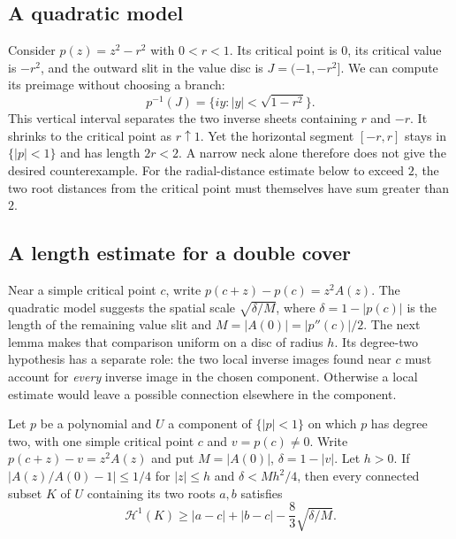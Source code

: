 \documentclass[11pt]{article}
\begin{document}
\subsection{A quadratic model}
Consider $p(z)=z^2-r^2$ with $0<r<1$. Its critical point is $0$,
its critical value is $-r^2$, and the outward slit in the value disc is
$J=(-1,-r^2]$. We can compute its preimage without choosing a branch:
\[
 p^{-1}(J)=\{iy:|y|<\sqrt{1-r^2}\}.
\]
This vertical interval separates the two inverse sheets containing $r$
and $-r$. It shrinks to the critical point as $r\uparrow1$. Yet the
horizontal segment $[-r,r]$ stays in $\{|p|<1\}$ and has length $2r<2$.
A narrow neck alone therefore does not give the desired counterexample.
For the radial-distance estimate below to exceed $2$, the two root
distances from the critical point must themselves have sum greater than $2$.

\subsection{A length estimate for a double cover}
Near a simple critical point $c$, write $p(c+z)-p(c)=z^2A(z)$.
The quadratic model suggests the spatial scale
$\sqrt{\delta/M}$, where $\delta=1-|p(c)|$ is the length of the
remaining value slit and $M=|A(0)|=|p''(c)|/2$. The next lemma makes
that comparison uniform on a disc of radius $h$.
Its degree-two hypothesis has a separate role: the two local inverse
images found near $c$ must account for \emph{every} inverse image in the
chosen component. Otherwise a local estimate would leave a possible
connection elsewhere in the component.

\begin{lemma}\label{lem:two-sheet-bottleneck}
Let $p$ be a polynomial and $U$ a component of $\{|p|<1\}$ on which $p$
has degree two, with one simple critical point $c$ and $v=p(c)\ne0$. Write
$p(c+z)-v=z^2A(z)$ and put $M=|A(0)|$, $\delta=1-|v|$.
Let $h>0$. If $|A(z)/A(0)-1|\le1/4$ for $|z|\le h$ and
$\delta<Mh^2/4$, then every connected subset $K$ of $U$ containing its
two roots $a,b$ satisfies
\[
 \mathcal H^1(K)\ge |a-c|+|b-c|-\frac83\sqrt{\delta/M}.
\]
\end{lemma}
\end{document}
